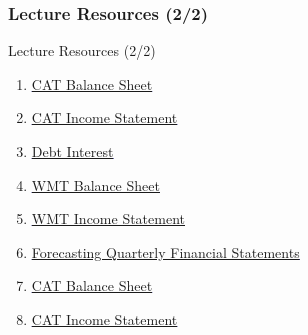 \documentclass[handout, 11pt]{beamer}
\begin{document}
\begin{frame}
\frametitle{Lecture Resources (2/2)}
{
\begin{block}{Lecture Resources (2/2)}
\begin{enumerate}
\item \textcolor{blue}{\underline{\href{https://nickderobertis.github.io/fin-model-course/\_static/Examples/DCF/Forecasting/Simple/cat\_annual\_bs.csv}{CAT Balance Sheet}}}
\item \textcolor{blue}{\underline{\href{https://nickderobertis.github.io/fin-model-course/\_static/Examples/DCF/Forecasting/Simple/cat\_annual\_income.csv}{CAT Income Statement}}}
\item \textcolor{blue}{\underline{\href{https://nickderobertis.github.io/fin-model-course/\_static/Materials for Lab Exercises/DCF/Forecasting/Simple/Debt Interest.xlsx}{Debt Interest}}}
\item \textcolor{blue}{\underline{\href{https://nickderobertis.github.io/fin-model-course/\_static/Examples/DCF/Forecasting/Complex/WMT Balance Sheet.xlsx}{WMT Balance Sheet}}}
\item \textcolor{blue}{\underline{\href{https://nickderobertis.github.io/fin-model-course/\_static/Examples/DCF/Forecasting/Complex/WMT Balance Sheet.xlsx}{WMT Income Statement}}}
\item \textcolor{blue}{\underline{\href{https://nickderobertis.github.io/fin-model-course/\_static/Examples/DCF/Forecasting/Complex/Forecasting Quarterly Financial Statements.ipynb}{Forecasting Quarterly Financial Statements}}}
\item \textcolor{blue}{\underline{\href{https://nickderobertis.github.io/fin-model-course/\_static/Materials for Lab Exercises/DCF/Forecasting/Complex/CAT Balance Sheet.xlsx}{CAT Balance Sheet}}}
\item \textcolor{blue}{\underline{\href{https://nickderobertis.github.io/fin-model-course/\_static/Materials for Lab Exercises/DCF/Forecasting/Complex/CAT Income Statement.xlsx}{CAT Income Statement}}}
\end{enumerate}
\vfill
\end{block}
}
\label{frames:resources}
\end{frame}
\end{document}
